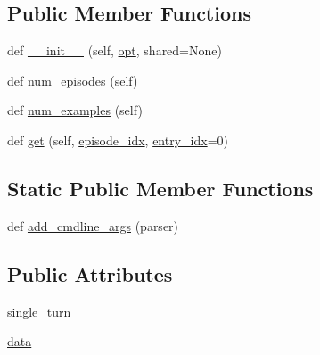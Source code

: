 \subsection*{Public Member Functions}
\begin{DoxyCompactItemize}
\item 
def \hyperlink{classparlai_1_1tasks_1_1empathetic__dialogues_1_1agents_1_1EmotionClassificationTeacher_ac2cf65ab6880f72d115cb2432b9c666a}{\+\_\+\+\_\+init\+\_\+\+\_\+} (self, \hyperlink{classparlai_1_1tasks_1_1empathetic__dialogues_1_1agents_1_1EmpatheticDialogueTeacher_a5f7a6df7d74bac8fce918c8216db33f9}{opt}, shared=None)
\item 
def \hyperlink{classparlai_1_1tasks_1_1empathetic__dialogues_1_1agents_1_1EmotionClassificationTeacher_acad8b18280f22798f1b0b6586e55765c}{num\+\_\+episodes} (self)
\item 
def \hyperlink{classparlai_1_1tasks_1_1empathetic__dialogues_1_1agents_1_1EmotionClassificationTeacher_a2421670b1bc496fdfe555208df4452a8}{num\+\_\+examples} (self)
\item 
def \hyperlink{classparlai_1_1tasks_1_1empathetic__dialogues_1_1agents_1_1EmotionClassificationTeacher_a21b3ea704923617e13db32c102f59841}{get} (self, \hyperlink{classparlai_1_1core_1_1teachers_1_1FixedDialogTeacher_afd4ebab8063eb42d182d30a1a41f133e}{episode\+\_\+idx}, \hyperlink{classparlai_1_1core_1_1teachers_1_1FixedDialogTeacher_ae3201b15f3c3b46a2f3511bad9b43e7d}{entry\+\_\+idx}=0)
\end{DoxyCompactItemize}
\subsection*{Static Public Member Functions}
\begin{DoxyCompactItemize}
\item 
def \hyperlink{classparlai_1_1tasks_1_1empathetic__dialogues_1_1agents_1_1EmotionClassificationTeacher_a3989db223e1faf2a956d99d6e0ceaed4}{add\+\_\+cmdline\+\_\+args} (parser)
\end{DoxyCompactItemize}
\subsection*{Public Attributes}
\begin{DoxyCompactItemize}
\item 
\hyperlink{classparlai_1_1tasks_1_1empathetic__dialogues_1_1agents_1_1EmotionClassificationTeacher_a89801cdf1ce6967ca038b50cd9caa94e}{single\+\_\+turn}
\item 
\hyperlink{classparlai_1_1tasks_1_1empathetic__dialogues_1_1agents_1_1EmotionClassificationTeacher_af0487bf9a19db59ac3f954463b9031e5}{data}
\end{DoxyCompactItemize}
